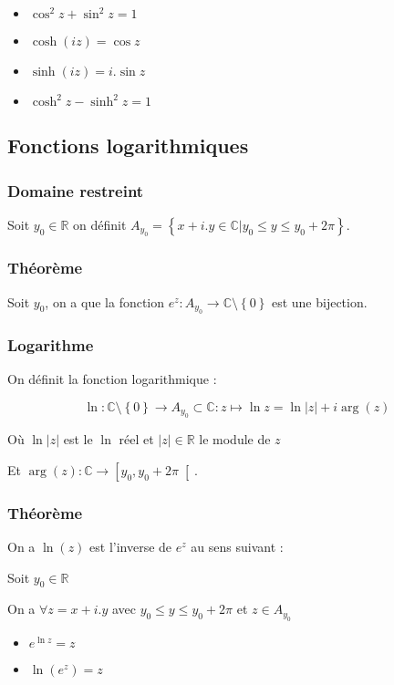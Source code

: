 \documentclass[a4paper,10pt]{report}
\newcommand{\ap}{\rightarrow}
\newcommand{\R}{\mathbb{R}}
\newcommand{\C}{\mathbb{C}}
\newcommand{\tset}[1]{\left\lbrace #1 \right\rbrace}
\newcommand{\abs}[1]{\left\vert #1 \right\vert}
\begin{document}
\begin{itemize}
\item{$\cos^2 z + \sin^2 z = 1$}
\item{$\cosh (iz) = \cos z$}
\item{$\sinh (iz) = i . \sin z$}
\item{$\cosh^2 z - \sinh^2 z = 1$}
\end{itemize}

\subsection{Fonctions logarithmiques}

\subsubsection{Domaine restreint}

Soit $y_0 \in \R$ on définit $A_{y_0}= \tset{x +i.y \in \C \vert y_0 \leq y \leq y_0 + 2\pi}$.

\subsubsection{Théorème}

Soit $y_0$, on a que la fonction $e^z : A_{y_0} \ap \C \setminus \tset{0}$ est une bijection.

\subsubsection{Logarithme}

On définit la fonction logarithmique :

\[\ln : \C\setminus\tset{0} \ap A_{y_0} \subset \C : z \mapsto \ln z = \ln \abs{z} + i \arg(z) \]

Où $\ln \abs{z}$ est le $\ln$ réel et $\abs{z} \in \R$ le module de $z$

Et $\arg(z) : \C \ap \left[ y_0 , y_0 + 2\pi \right[$.

\subsubsection{Théorème}

On a $\ln(z)$ est l'inverse de $e^z$ au sens suivant :

Soit $y_0 \in \R$

On a $\forall z = x + i.y$ avec $y_0 \leq y \leq y_0 + 2\pi$ et $z \in A_{y_0}$

\begin{itemize}
\item{$e^{\ln z} = z$}
\item{$\ln(e^z) = z$}
\end{itemize}
\end{document}
